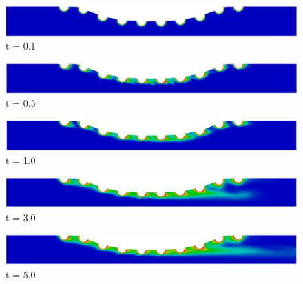 \begin{figure}[H]
     \begin{minipage}{.50\linewidth}
      \centering
      \includegraphics[scale=0.18]{./02_chaps/cap_solution/figure/conc10_CurvedStrut1.png}\\
      t = 0.1
     \end{minipage}%
     \begin{minipage}{.50\linewidth}
      \centering
      \includegraphics[scale=0.18]{./02_chaps/cap_solution/figure/conc10_CurvedStrut2.png}\\
      t = 0.5
     \end{minipage}
     \begin{minipage}{.50\linewidth}
     \medskip
      \centering
      \includegraphics[scale=0.18]{./02_chaps/cap_solution/figure/conc10_CurvedStrut3.png}\\
      t = 1.0
     \end{minipage}%
     \begin{minipage}{.50\linewidth}
     \medskip
      \centering
      \includegraphics[scale=0.18]{./02_chaps/cap_solution/figure/conc10_CurvedStrut4.png}\\
      t = 3.0
     \end{minipage}
     \begin{minipage}{.50\linewidth}
      \centering
      \includegraphics[scale=0.18]{./02_chaps/cap_solution/figure/conc10_CurvedStrut5.png}\\
      t = 5.0
     \end{minipage}%
     \begin{minipage}{.50\linewidth}

\end{minipage}
\end{figure}
